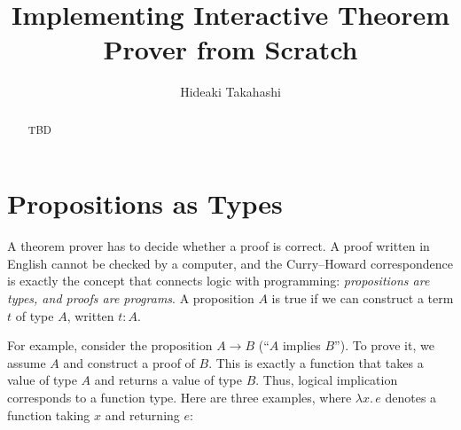 \documentclass[acmsmall,screen,nonacm]{acmart}
\begin{document}
\title{Implementing Interactive Theorem Prover from Scratch}

\author{Hideaki Takahashi}

\begin{abstract}
    TBD
\end{abstract}

\maketitle



\section{Propositions as Types}
\label{sec:curry-howard}

A theorem prover has to decide whether a proof is correct. A proof written in English cannot be checked by a computer, 
and the Curry--Howard correspondence is exactly the concept that connects logic with programming:
\emph{propositions are types, and proofs are programs}.
A proposition $A$ is true if we can construct a term $t$ of type $A$, written $t : A$.

For example, consider the proposition $A \to B$ (``$A$ implies $B$'').
To prove it, we assume $A$ and construct a proof of $B$.
This is exactly a function that takes a value of type $A$ and returns a value of type $B$.
Thus, logical implication corresponds to a function type. Here are three examples, where $\lambda x.\,e$ denotes a 
function taking $x$ and returning $e$:
\end{document}
